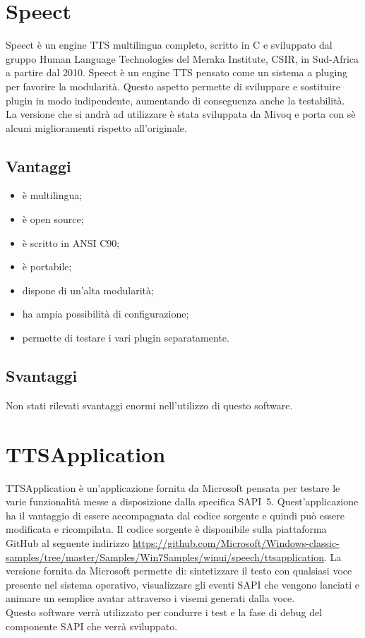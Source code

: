 \section{Speect}
Speect è un engine TTS multilingua completo, scritto in C e sviluppato dal gruppo Human Language Technologies del Meraka Institute, CSIR, in Sud-Africa a partire dal 2010. Speect è un engine TTS pensato come un sistema a \gls{pluging} per favorire la modularità. Questo aspetto permette di sviluppare e sostituire plugin in modo indipendente, aumentando di conseguenza anche la testabilità.\\
La versione che si andrà ad utilizzare è stata sviluppata da Mivoq e porta con sè alcuni miglioramenti rispetto all'originale.
\subsection*{Vantaggi}
\begin{itemize}
	\item è multilingua;
	\item è open source;
	\item è scritto in ANSI C90;
	\item è portabile;
	\item dispone di un'alta modularità;
	\item ha ampia possibilità di configurazione;
	\item permette di testare i vari plugin separatamente.
\end{itemize}
\subsection*{Svantaggi}
Non stati rilevati svantaggi enormi nell'utilizzo di questo software.   
\section{TTSApplication}
TTSApplication è un'applicazione fornita da Microsoft pensata per testare le varie funzionalità messe a disposizione dalla specifica SAPI~5. Quest'applicazione ha il vantaggio di essere accompagnata dal codice sorgente e quindi può essere modificata e ricompilata. Il codice sorgente è disponibile sulla piattaforma GitHub al seguente indirizzo \url{https://github.com/Microsoft/Windows-classic-samples/tree/master/Samples/Win7Samples/winui/speech/ttsapplication}.
La versione fornita da Microsoft permette di: sintetizzare il testo con qualsiasi voce presente nel sistema operativo, visualizzare gli eventi SAPI che vengono lanciati e animare un semplice avatar attraverso i visemi generati dalla voce.\\
Questo software verrà utilizzato per condurre i test e la fase di debug del componente SAPI che verrà sviluppato. 
